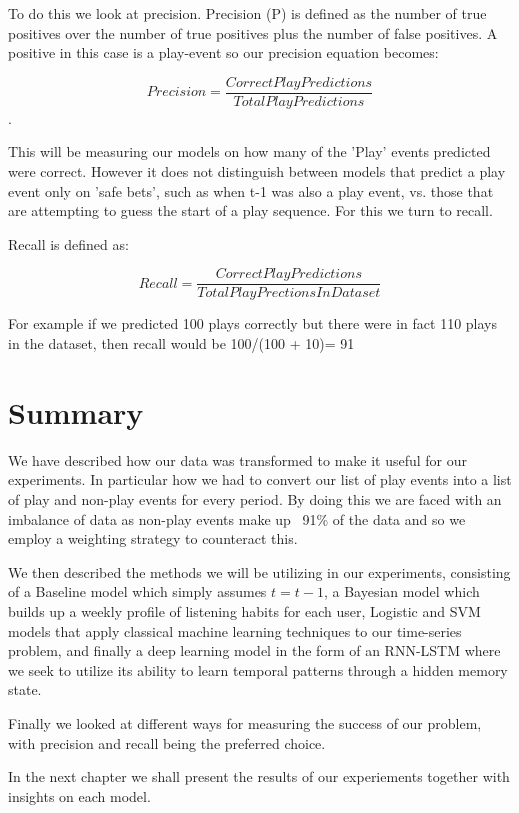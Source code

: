 To do this we look at precision. Precision (P) is defined as the number of true positives over the number of true positives plus the number of false positives. A positive in this case is a play-event so our precision equation becomes:

$$Precision = \frac{Correct Play Predictions}{Total Play Predictions}$$. 

This will be measuring our models on how many of the 'Play' events predicted were correct. However it does not distinguish between models that predict a play event only on 'safe bets', such as when t-1 was also a play event, vs. those that are attempting to guess the start of a play sequence. For this we turn to recall.

Recall is defined as:

$$Recall = \frac{CorrectPlayPredictions}{TotalPlayPrectionsInDataset}$$

For example if we predicted 100 plays correctly but there were in fact 110 plays in the dataset, then recall would be 100/(100 + 10)= 91%


\section{Summary}

We have described how our data was transformed to make it useful for our experiments. In particular how we had to convert our list of play events into a list of play and non-play events for every period. By doing this we are faced with an imbalance of data as non-play events make up ~91\% of the data and so we employ a weighting strategy to counteract this.

We then described the methods we will be utilizing in our experiments, consisting of a Baseline model which simply assumes $t =t-1$, a Bayesian model which builds up a weekly profile of listening habits for each user, Logistic and SVM models that apply classical machine learning techniques to our time-series problem, and finally a deep learning model in the form of an RNN-LSTM where we seek to utilize its ability to learn temporal patterns through a hidden memory state.

Finally we looked at different ways for measuring the success of our problem, with precision and recall being the preferred choice.

In the next chapter we shall present the results of our experiements together with insights on each model.